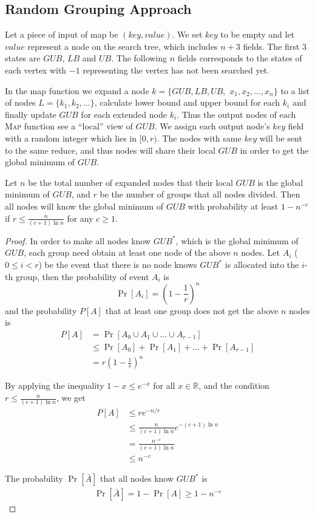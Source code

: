 \subsection{Random Grouping Approach}
\label{random_group}

Let a piece of input of map be $(key, value)$. We set $key$ to be empty and let $value$ represent a node on the search tree, which includes $n+3$ fields. The first $3$ states are $GUB$, $LB$ and $UB$. The following $n$ fields corresponds to the states of each vertex with $-1$ representing the vertex has not been searched yet.

In the map function we expand a node $k=\{GUB, LB, UB,$ $x_1, x_2, \dots, x_n\}$ to a list of nodes $L=\{k_1, k_2, \dots\}$, calculate lower bound and upper bound for each $k_i$ and finally update $GUB$ for each extended node $k_i$. Thus the output nodes of each \textsc{Map} function see a ``local'' view of $GUB$. We assign each output node's $key$ field with a random integer which lies in $[0, r)$. The nodes with same $key$ will be sent to the same reduce, and thus nodes will share their local $GUB$ in order to get the global minimum of $GUB$.

\begin{theorem}
Let $n$ be the total number of expanded nodes that their local $GUB$ is the global minimum of $GUB$, and $r$ be the number of groups that all nodes divided. Then all nodes will know the global minimum of $GUB$ with probability at least $1-n^{-c}$ if $r\le \displaystyle{\frac{n}{(c+1)\ln{n}}}$ for any $c\ge 1$.
\end{theorem}
\begin{proof}
In order to make all nodes know $GUB^*$, which is the global minimum of $GUB$, each group need obtain at least one node of the above $n$ nodes. Let $A_i$ ($0\le i < r$) be the event that there is no node knows $GUB^*$ is allocated into the $i$-th group, then the probability of event $A_i$ is
\[ \Pr[A_i] = \left(1-\frac{1}{r}\right)^n \]
and the probability $P[A]$ that at least one group does not get the above $n$ nodes is
\begin{align*}
 P[A] & = \Pr[A_0\cup A_1\cup...\cup A_{r-1}] \\
 & \le \Pr[A_0]+\Pr[A_1]+...+\Pr[A_{r-1}] \\
 & = r\left(1-\frac{1}{r}\right)^n
\end{align*}

By applying the inequality $1-x\le e^{-x}$ for all $x\in\mathbb{R}$, and the condition $r\le \displaystyle{\frac{n}{(c+1)\ln{n}}}$, we get
\begin{align*}
P[A] & \le r e^{-n/r} \\
& \le \frac{n}{(c+1)\ln{n}} e^{-(c+1)\ln{n}} \\
& = \frac{n^{-c}}{(c+1)\ln{n}} \\
& \le n^{-c}
\end{align*}

The probability $\Pr[\bar{A}]$ that all nodes know $GUB^*$ is
\begin{align*}
\Pr[\bar{A}] = 1-\Pr[A] \ge 1-n^{-c}
\end{align*}

\end{proof}

